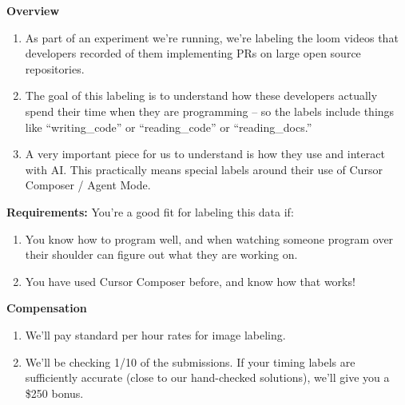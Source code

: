 \documentclass{article}
\begin{document}
\begin{instructionbox}

\textbf{Overview}
\begin{enumerate}
    \item As part of an experiment we’re running, we’re labeling the loom videos that developers recorded of them implementing PRs on large open source repositories.
    \item The goal of this labeling is to understand how these developers actually spend their time when they are programming – so the labels include things like “writing\_code” or “reading\_code” or “reading\_docs.”
    \item A very important piece for us to understand is how they use and interact with AI. This practically means special labels around their use of Cursor Composer / Agent Mode.
\end{enumerate}

\textbf{Requirements:}
You’re a good fit for labeling this data if:
\begin{enumerate}
    \item You know how to program well, and when watching someone program over their shoulder can figure out what they are working on. 
    \item You have used Cursor Composer before, and know how that works!
\end{enumerate}

\textbf{Compensation}
\begin{enumerate}
    \item We’ll pay standard per hour rates for image labeling. 
    \item We’ll be checking 1/10 of the submissions. If your timing labels are sufficiently accurate (close to our hand-checked solutions), we’ll give you a \$250 bonus.
\end{enumerate}


\end{instructionbox}
\end{document}
